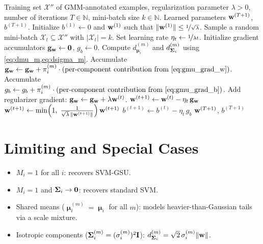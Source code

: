 \documentclass[11pt, letterpaper]{article}
\newcommand{\bSigma}{\vb{\Sigma}}
\newcommand{\bmu}{\boldsymbol{\upmu}}
\newcommand{\setX}{\mathcal{X}}
\begin{document}
\begin{algorithm}[H]
\caption{Stochastic sub-gradient descent for SVM-GMU.}
\label{alg:sgd_gmu}
\begin{algorithmic}[1]
\Require Training set $\setX''$ of GMM-annotated examples, regularization parameter $\lambda > 0$, number of iterations $T \in \mathbb{N}$, mini-batch size $k \in \mathbb{N}$.
\Ensure Learned parameters $\vb{w}^{(T+1)}$, $b^{(T+1)}$.
\State Initialize $b^{(1)} \gets 0$ and $\vb{w}^{(1)}$ such that $\|\vb{w}^{(1)}\| \leq \nicefrac{1}{\sqrt{\lambda}}$.
    \State Sample a random mini-batch $\setX_t \subseteq \setX''$ with $|\setX_t| = k$.
    \State Set learning rate $\eta_t \gets \nicefrac{1}{\lambda t}$.
    \State Initialize gradient accumulators $\vb{g}_{\vb{w}} \gets \vb{0}$, $g_b \gets 0$.
    \For{each example $i$ in $\setX_t$}
            \State Compute $d_{\bmu_i}^{(m)}$ and $d_{\bSigma_i}^{(m)}$ using \cref{eq:dmu_m,eq:dsigma_m}.
            \State Accumulate $\vb{g}_{\vb{w}} \gets \vb{g}_{\vb{w}} + \pi_i^{(m)}\cdot (\text{per-component contribution from \cref{eq:gmu_grad_w}})$.
            \State Accumulate $g_b \gets g_b + \pi_i^{(m)}\cdot (\text{per-component contribution from \cref{eq:gmu_grad_b}})$.
        \EndFor
    \EndFor
    \State Add regularizer gradient: $\vb{g}_{\vb{w}} \gets \vb{g}_{\vb{w}} + \lambda \vb{w}^{(t)}$.
    \State $\vb{w}^{(t+1)} \gets \vb{w}^{(t)} - \eta_t\, \vb{g}_{\vb{w}}$ 
    \State $\vb{w}^{(t+1)} \gets \min\!\left(1,\; \frac{1}{\sqrt{\lambda}\,\|\vb{w}^{(t+1)}\|}\right) \vb{w}^{(t+1)}$ 
    \State $b^{(t+1)} \gets b^{(t)} - \eta_t\, g_b$ 
\EndFor
\State \Return $\vb{w}^{(T+1)}$, $b^{(T+1)}$
\end{algorithmic}
\end{algorithm}

\section{Limiting and Special Cases}\label{sec:gmu_special}

\begin{itemize}[leftmargin=2em]
    \item $M_i = 1$ for all $i$: recovers SVM-GSU.
    \item $M_i = 1$ and $\bSigma_i \to \vb{0}$: recovers standard SVM.
    \item Shared means ($\bmu_i^{(m)} = \bmu_i$ for all $m$): models heavier-than-Gaussian tails via a scale mixture.
    \item Isotropic components ($\bSigma_i^{(m)} = (\sigma_i^{(m)})^2 \vb{I}$): $d_{\bSigma_i}^{(m)} = \sqrt{2}\, \sigma_i^{(m)} \|\vb{w}\|$.
\end{itemize}
\end{document}
